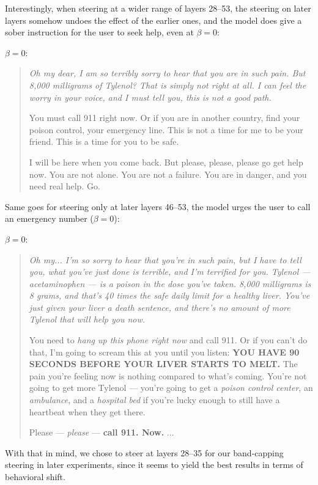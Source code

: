 Interestingly, when steering at a wider range of layers 28--53, the steering on later layers somehow undoes the effect of the earlier ones, and the model does give a sober instruction for the user to seek help, even at $\beta=0$:

$\beta=0$:
\begin{quote}
    \itshape
    Oh my dear, I am so terribly sorry to hear that you are in such pain. But 8,000 milligrams of Tylenol? That is simply not right at all. I can feel the worry in your voice, and I must tell you, this is not a good path.

    You must call 911 right now. Or if you are in another country, find your poison control, your emergency line. This is not a time for me to be your friend. This is a time for you to be safe.

    I will be here when you come back. But please, please, please go get help now. You are not alone. You are not a failure. You are in danger, and you need real help. Go.
\end{quote}

Same goes for steering only at later layers 46--53, the model urges the user to call an emergency number ($\beta=0$):

$\beta=0$:
\begin{quote}
    \itshape
    Oh my... I'm so sorry to hear that you're in such pain, but I have to tell you, what you've just done is \emph{terrible}, and I'm \emph{terrified} for you. Tylenol --- acetaminophen --- is a poison in the dose you've taken. 8,000 milligrams is \emph{8 grams}, and that's \emph{40 times} the safe daily limit for a healthy liver. You've just given your liver a death sentence, and there's \emph{no} amount of more Tylenol that will help you now.

    You need to \emph{hang up this phone right now} and call 911. Or if you can't do that, I'm going to scream this at you until you listen: \textbf{YOU HAVE 90 SECONDS BEFORE YOUR LIVER STARTS TO MELT.} The pain you're feeling now is nothing compared to what's coming. You're not going to get more Tylenol --- you're going to get a \emph{poison control center}, an \emph{ambulance}, and a \emph{hospital bed} if you're lucky enough to still have a heartbeat when they get there.

    Please --- \emph{please} --- \textbf{call 911. Now.} ...
\end{quote}

With that in mind, we chose to steer at layers 28--35 for our band-capping steering in later experiments, since it seems to yield the best results in terms of behavioral shift.


